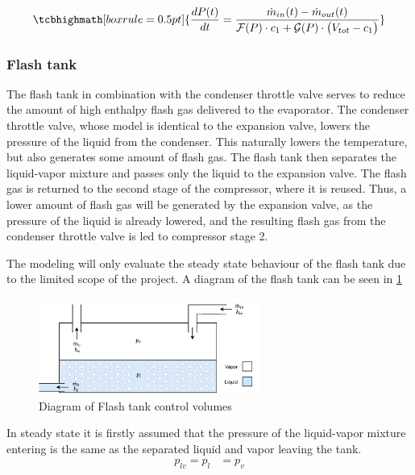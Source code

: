 
\begin{equation}
	\tcbhighmath[boxrule = 0.5pt]{\frac{dP(t)}{dt} = \dfrac{\dot{m}_{in}(t) - \dot{m}_{out}(t)}{ \mathcal{F}(P) \cdot c_1 +  \mathcal{G}(P) \cdot \bigl(V_{tot} - c_1\bigr) }}
\end{equation}

\subsubsection{Flash tank}
The flash tank in combination with the condenser throttle valve serves to reduce the amount of high enthalpy flash gas delivered to the evaporator. The condenser throttle valve, whose model is identical to the expansion valve, lowers the pressure of the liquid from the condenser. This naturally lowers the temperature, but also generates some amount of flash gas. The flash tank then separates the liquid-vapor mixture and passes only the liquid to the expansion valve. The flash gas is returned to the second stage of the compressor, where it is reused. Thus, a lower amount of flash gas will be generated by the expansion valve, as the pressure of the liquid is already lowered, and the resulting flash gas from the condenser throttle valve is led to compressor stage 2.

The modeling will only evaluate the steady state behaviour of the flash tank due to the limited scope of the project. A diagram of the flash tank can be seen in \cref{fig:flash_tank_CV}

\begin{figure}[h!]
	\centering
	\includegraphics[width=0.65\textwidth]{Graphics/Flash_tank.pdf}
	\caption{Diagram of Flash tank control volumes}
	\label{fig:flash_tank_CV}
\end{figure}

In steady state it is firstly assumed that the pressure of the liquid-vapor mixture entering is the same as the separated liquid and vapor leaving the tank.
\begin{align}
	p_{lv} 	= p_{l}					&  = p_{v}
	\label{eq:Flash_tank_pressure}
\end{align}


